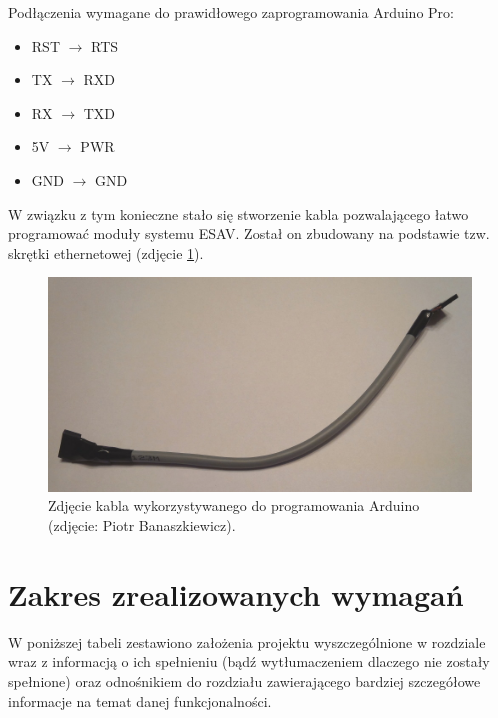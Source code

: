 Podłączenia wymagane do prawidłowego zaprogramowania Arduino Pro:

\begin{itemize}
\item RST $\rightarrow$ RTS
\item TX $\rightarrow$ RXD
\item RX $\rightarrow$ TXD
\item 5V $\rightarrow$ PWR
\item GND $\rightarrow$ GND
\end{itemize}

W związku z tym konieczne stało się stworzenie kabla pozwalającego łatwo programować moduły systemu ESAV. Został on zbudowany na podstawie tzw. skrętki ethernetowej (zdjęcie \ref{fig:cable}).

\begin{figure}[h]
	\centering
	\includegraphics[scale=0.3]{pics/cable.jpg}
	\caption{\label{fig:cable}Zdjęcie kabla wykorzystywanego do programowania Arduino (zdjęcie: Piotr Banaszkiewicz).}
\end{figure}


\section{Zakres zrealizowanych wymagań}
\label{sec:zrealizowane_wymagania}

W poniższej tabeli zestawiono założenia projektu wyszczególnione w rozdziale wraz z informacją o ich spełnieniu (bądź wytłumaczeniem dlaczego nie zostały spełnione) oraz odnośnikiem do rozdziału zawierającego bardziej szczegółowe informacje na temat danej funkcjonalności.

